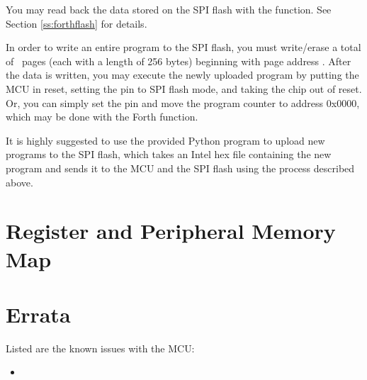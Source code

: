 \documentclass[11pt,pdftex,portrait,letterpaper]{article}
\begin{document}
You may read back the data stored on the SPI flash with the  function. See Section \ref{ss:forthflash} for details.

In order to write an entire program to the SPI flash, you must write/erase a total of \RamNumPages\ pages (each with a length of 256 bytes) beginning with page address \RamStartAddress. After the data is written, you may execute the newly uploaded program by putting the MCU in reset, setting the  pin to SPI flash mode, and taking the chip out of reset. Or, you can simply set the  pin and move the program counter to address 0x0000, which may be done with the  Forth function.

It is highly suggested to use the provided Python program  to upload new programs to the SPI flash, which takes an Intel hex file containing the new program and sends it to the MCU and the SPI flash using the process described above.

\newpage







\section{Register and Peripheral Memory Map} \label{s:regMemMap}


\newpage

\section{Errata} \label{s:errata}
Listed are the known issues with the {\AsicNameForUserGuide} MCU:

\begin{itemize}
	\item 
\end{itemize}
\end{document}
